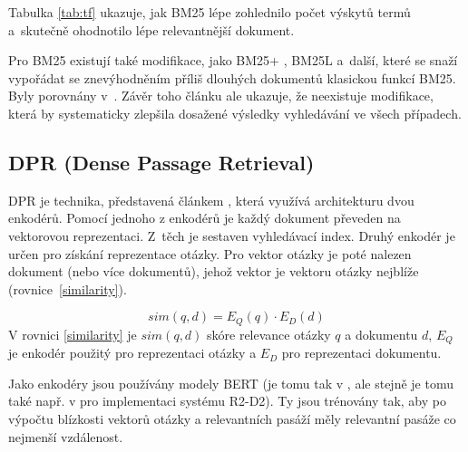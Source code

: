 Tabulka \ref{tab:tf} ukazuje, jak BM25 lépe zohlednilo počet výskytů termů a~skutečně ohodnotilo lépe relevantnější dokument.\par \medskip
Pro BM25 existují také modifikace, jako BM25+ \cite{bm25_too_long}, BM25L \cite{bm25_plus} a~další, které se snaží vypořádat se znevýhodněním příliš dlouhých dokumentů klasickou funkcí BM25. Byly porovnány v~\cite{bm25_improvements}. Závěr toho článku ale ukazuje, že neexistuje modifikace, která by systematicky zlepšila dosažené výsledky vyhledávání ve všech případech.\par

\subsection{DPR (Dense Passage Retrieval)}
\label{dpr}
DPR je technika, představená článkem \cite{dpr}, která využívá architekturu dvou enkodérů. Pomocí jednoho z enkodérů je  každý dokument převeden na vektorovou reprezentaci. Z~těch je sestaven vyhledávací index. Druhý enkodér je určen pro získání reprezentace otázky. Pro vektor otázky je poté nalezen dokument (nebo více dokumentů), jehož vektor je vektoru otázky nejblíže (rovnice~\ref{similarity}).\par
\begin{equation}
    \label{similarity}
    sim(q,d) = E_Q(q)\cdot E_D(d)
\end{equation}
V rovnici \ref{similarity} \cite{dpr} je $sim(q,d)$ skóre relevance otázky $q$ a dokumentu $d$, $E_Q$ je enkodér použitý pro reprezentaci otázky a $E_D$ pro reprezentaci dokumentu.\par
Jako enkodéry jsou používány modely BERT (je tomu tak v \cite{dpr}, ale stejně je tomu také např. v \cite{fajcik2021pruning} pro implementaci systému R2-D2). Ty jsou trénovány tak, aby po výpočtu blízkosti vektorů otázky a relevantních pasáží měly relevantní pasáže co nejmenší vzdálenost.


